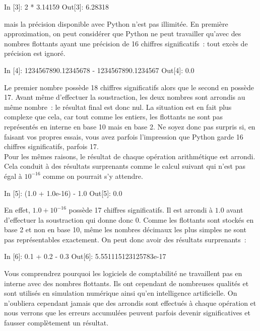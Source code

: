 \documentclass{magnoliaold}
\begin{document}
\begin{pythoncode}
In [3]: 2 * 3.14159
Out[3]: 6.28318
\end{pythoncode}
 
\noindent mais la précision disponible avec Python n'est pas illimitée. En première approximation,
on peut considérer que Python ne peut travailler qu'avec des nombres flottants ayant
une précision de 16 chiffres significatifs~: tout excès de précision est ignoré.

\begin{pythoncode}
In [4]: 1234567890.12345678 - 1234567890.1234567
Out[4]: 0.0
\end{pythoncode}

\noindent Le premier nombre possède 18 chiffres
significatifs alors que le second en possède 17. Avant même d'effectuer la soustraction, les deux
nombres sont arrondis au même nombre~: le résultat final est donc nul. La situation est
en fait plus complexe que cela, car tout comme les entiers, les flottants ne sont pas
représentés en interne en base 10 mais en base 2. Ne soyez donc pas surpris si, en faisant vos propres
essais, vous avez parfois l'impression que Python garde 16 chiffres significatifs,
parfois 17.\\

Pour les mêmes raisons, le résultat de chaque opération arithmétique est arrondi. Cela 
conduit à des résultats surprenants comme le calcul suivant qui n'est pas égal à
$10^{-16}$ comme on pourrait s'y attendre.

\begin{pythoncode}
In [5]: (1.0 + 1.0e-16) - 1.0
Out[5]: 0.0
\end{pythoncode}

\noindent En effet, $1.0 + 10^{-16}$ possède 17 chiffres significatifs. Il est arrondi
à $1.0$ avant d'effectuer la soustraction qui donne donc 0. Comme les
flottants sont stockés en base 2 et non en base 10, même les nombres décimaux les plus
simples ne sont pas représentables exactement. On peut donc avoir des résultats
surprenants~:

\begin{pythoncode}
In [6]: 0.1 + 0.2 - 0.3
Out[6]: 5.551115123125783e-17
\end{pythoncode}

\noindent Vous comprendrez pourquoi les logiciels de comptabilité ne travaillent pas en
interne avec des nombres flottants. Ils ont cependant de nombreuses qualités et sont utilisés en simulation numérique ainsi qu'en intelligence artificielle. On n'oubliera cependant jamais que des arrondis sont effectués à
chaque opération et nous verrons que les erreurs accumulées peuvent parfois devenir 
significatives et fausser complètement un résultat.\\
\end{document}
